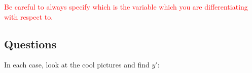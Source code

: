 \textcolor{red}{Be careful to always specify which is the variable which you are differentiating with respect to.}

\clearpage
\subsection*{Questions}
\begin{questions}
  \questioM In each case, look at the cool pictures and find $ y' $:
\end{questions}
